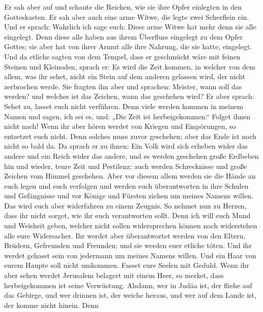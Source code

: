  Er sah aber auf und schaute die Reichen, wie sie ihre Opfer
einlegten in den Gotteskasten.  Er sah aber auch eine arme
Witwe, die legte zwei Scherflein ein.  Und er sprach:
Wahrlich ich sage euch: Diese arme Witwe hat mehr denn sie alle
eingelegt.  Denn diese alle haben aus ihrem Überfluss
eingelegt zu dem Opfer Gottes; sie aber hat von ihrer Armut alle ihre
Nahrung, die sie hatte, eingelegt.  Und da etliche sagten
von dem Tempel, dass er geschmückt wäre mit feinen Steinen und
Kleinoden, sprach er:  Es wird die Zeit kommen, in welcher
von dem allem, was ihr sehet, nicht ein Stein auf dem anderen gelassen
wird, der nicht zerbrochen werde.  Sie fragten ihn aber und
sprachen: Meister, wann soll das werden? und welches ist das Zeichen,
wann das geschehen wird?  Er aber sprach: Sehet zu, lasset
euch nicht verführen. Denn viele werden kommen in meinem Namen und
sagen, ich sei es, und: „Die Zeit ist herbeigekommen.`` Folget ihnen
nicht nach!  Wenn ihr aber hören werdet von Kriegen und
Empörungen, so entsetzet euch nicht. Denn solches muss zuvor geschehen;
aber das Ende ist noch nicht so bald da.  Da sprach er zu
ihnen: Ein Volk wird sich erheben wider das andere und ein Reich wider
das andere,  und es werden geschehen große Erdbeben hin und
wieder, teure Zeit und Pestilenz; auch werden Schrecknisse und große
Zeichen vom Himmel geschehen.  Aber vor diesem allem werden
sie die Hände an euch legen und euch verfolgen und werden euch
überantworten in ihre Schulen und Gefängnisse und vor Könige und Fürsten
ziehen um meines Namens willen.  Das wird euch aber
widerfahren zu einem Zeugnis.  So nehmet nun zu Herzen,
dass ihr nicht sorget, wie ihr euch verantworten sollt. 
Denn ich will euch Mund und Weisheit geben, welcher nicht sollen
widersprechen können noch widerstehen alle eure Widersacher.
 Ihr werdet aber überantwortet werden von den Eltern,
Brüdern, Gefreunden und Freunden; und sie werden euer etliche töten.
 Und ihr werdet gehasst sein von jedermann um meines Namens
willen.  Und ein Haar von eurem Haupte soll nicht umkommen.
 Fasset eure Seelen mit Geduld.  Wenn ihr aber
sehen werdet Jerusalem belagert mit einem Heer, so merket, dass
herbeigekommen ist seine Verwüstung.  Alsdann, wer in Judäa
ist, der fliehe auf das Gebirge, und wer drinnen ist, der weiche heraus,
und wer auf dem Lande ist, der komme nicht hinein.  Denn
